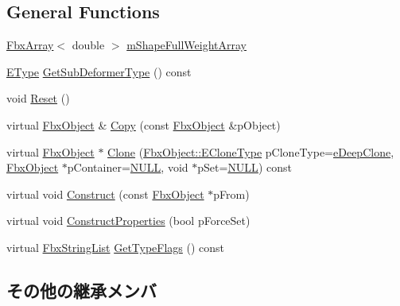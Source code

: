 \subsection*{General Functions}
\begin{DoxyCompactItemize}
\item 
\hyperlink{class_fbx_array}{Fbx\+Array}$<$ double $>$ \hyperlink{class_fbx_blend_shape_channel_a99111b4513741df3e42dd87b1c08d347}{m\+Shape\+Full\+Weight\+Array}
\item 
\hyperlink{class_fbx_sub_deformer_aed7eba8aabbb8b25a8ddbab127d67319}{E\+Type} \hyperlink{class_fbx_blend_shape_channel_a1dba13e481ea7ba1874587ad92ee0347}{Get\+Sub\+Deformer\+Type} () const
\item 
void \hyperlink{class_fbx_blend_shape_channel_a3b633999bdf324fe9ac96e297c572eba}{Reset} ()
\item 
virtual \hyperlink{class_fbx_object}{Fbx\+Object} \& \hyperlink{class_fbx_blend_shape_channel_a7bf3a456eafada45fa2e934f15422026}{Copy} (const \hyperlink{class_fbx_object}{Fbx\+Object} \&p\+Object)
\item 
virtual \hyperlink{class_fbx_object}{Fbx\+Object} $\ast$ \hyperlink{class_fbx_blend_shape_channel_a37993d2cccb4376edb241577ccbd061f}{Clone} (\hyperlink{class_fbx_object_a9f5626b2d2135684d6ea1e6e4ad2acbb}{Fbx\+Object\+::\+E\+Clone\+Type} p\+Clone\+Type=\hyperlink{class_fbx_object_a9f5626b2d2135684d6ea1e6e4ad2acbbaacdf137ca059c572798287e98c4236d0}{e\+Deep\+Clone}, \hyperlink{class_fbx_object}{Fbx\+Object} $\ast$p\+Container=\hyperlink{fbxarch_8h_a070d2ce7b6bb7e5c05602aa8c308d0c4}{N\+U\+LL}, void $\ast$p\+Set=\hyperlink{fbxarch_8h_a070d2ce7b6bb7e5c05602aa8c308d0c4}{N\+U\+LL}) const
\item 
virtual void \hyperlink{class_fbx_blend_shape_channel_ad16237e4706289af6a9235b8425415cb}{Construct} (const \hyperlink{class_fbx_object}{Fbx\+Object} $\ast$p\+From)
\item 
virtual void \hyperlink{class_fbx_blend_shape_channel_a6ab3c2d6435d70a7c1b182097802ba90}{Construct\+Properties} (bool p\+Force\+Set)
\item 
virtual \hyperlink{class_fbx_string_list}{Fbx\+String\+List} \hyperlink{class_fbx_blend_shape_channel_a354002154ea342025ba0936e656b640a}{Get\+Type\+Flags} () const
\end{DoxyCompactItemize}
\subsection*{その他の継承メンバ}


